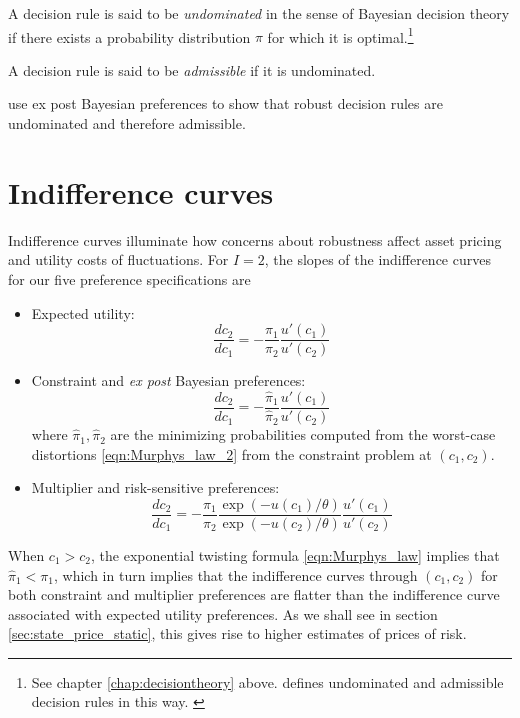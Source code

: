 

\begin{definition}
A decision rule is said to
be {\em undominated} in the sense of Bayesian decision theory if there exists a probability distribution $\pi$ for which it is optimal.\footnote{See chapter \ref{chap:decisiontheory} above. \citet{Ferguson} defines  undominated and admissible decision rules in this way. \label{ftnt:admissible}}
\end{definition}

\begin{definition} A decision rule is said to be {\em admissible} if it is undominated.
\end{definition}

\begin{remark}
\citet{hsmonograph} use ex post Bayesian preferences to show that robust decision rules are undominated and
therefore admissible.
\end{remark}



\section{Indifference curves}
Indifference curves  illuminate how  concerns about robustness affect
asset pricing and utility costs of fluctuations.
For $I=2$,
  the slopes of the indifference curves for our five preference
specifications are

\begin{itemize}

\item
 Expected utility:
\[ \frac{d c_2}{d c_1} = - \frac{\pi_1}{\pi_2}\frac{u'(c_1)}{u'(c_2)} \]

\item
 Constraint and {\em ex post} Bayesian preferences:
\[ \frac{d c_2}{d c_1} = - \frac{\hat \pi_1}{\hat \pi_2}\frac{u'(c_1)}{u'(c_2)} \]
where $\hat \pi_1, \hat \pi_2$ are the minimizing probabilities computed from the worst-case distortions
 \eqref{eqn:Murphys_law_2} from the constraint problem at
 $(c_1, c_2)$.

\item
Multiplier  and risk-sensitive preferences:
\[ \frac{d c_2}{d c_1} = - \frac{\pi_1}{\pi_2} \frac{\exp(- u(c_1)/\theta)}{\exp (- u(c_2)/\theta)}    \frac{u'(c_1)}{u'(c_2)} \]


\end{itemize}


When $c_1 > c_2$, the exponential twisting formula \eqref{eqn:Murphys_law} implies that $\hat \pi_1 < \pi_1$, which in turn implies
that the indifference curves  through  $(c_1, c_2)$ for both constraint and multiplier preferences are flatter than the indifference curve
associated with expected utility preferences.  As we shall see in section \ref{sec:state_price_static}, this gives rise to higher estimates of  prices of risk.




